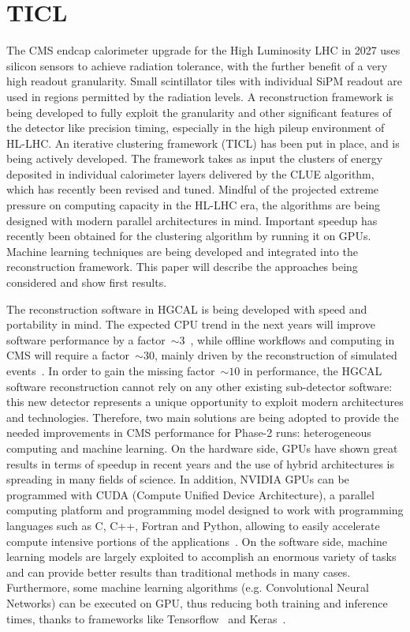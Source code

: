 \section{TICL}
\label{sec:hgcal:reco}


The CMS endcap calorimeter upgrade for the High Luminosity LHC in 2027 uses silicon sensors to achieve radiation tolerance, with the further benefit of a very high readout granularity. Small scintillator tiles with individual SiPM readout are used in regions permitted by the radiation levels. A reconstruction framework is being developed to fully exploit the granularity and other significant features of the detector like precision timing, especially in the high pileup environment of HL-LHC. An iterative clustering framework (TICL) has been put in place, and is being actively developed. The framework takes as input the clusters of energy deposited in individual calorimeter layers delivered by the CLUE algorithm, which has recently been revised and tuned. Mindful of the projected extreme pressure on computing capacity in the HL-LHC era, the algorithms are being designed with modern parallel architectures in mind. Important speedup has recently been obtained for the clustering algorithm by running it on GPUs. Machine learning techniques are being developed and integrated into the reconstruction framework. This paper will describe the approaches being considered and show first results.



The reconstruction software in HGCAL is being developed with speed and portability in mind. The expected CPU trend in the next years will improve software performance by a factor~$ \sim3$~\cite{4}, while offline workflows and computing in CMS will require a factor~$ \sim30$, mainly driven by the reconstruction of simulated events~\cite{5}. In order to gain the missing factor~$ \sim10$ in performance, the HGCAL software reconstruction cannot rely on any other existing sub-detector software: this new detector represents a unique opportunity to exploit modern architectures and technologies. Therefore, two main solutions are being adopted to provide the needed improvements in CMS performance for Phase-2 runs: heterogeneous computing and machine learning. On the hardware side, GPUs have shown great results in terms of speedup in recent years and the use of hybrid architectures is spreading in many fields of science. In addition, NVIDIA GPUs can be programmed with CUDA (Compute Unified Device Architecture), a parallel computing platform and programming model designed to work with programming languages such as C, C++, Fortran and Python, allowing to easily accelerate compute intensive portions of the applications~\cite{6}. On the software side, machine learning models are largely exploited to accomplish an enormous variety of tasks and can provide better results than traditional methods in many cases. Furthermore, some machine learning algorithms (e.g. Convolutional Neural Networks) can be executed on GPU, thus reducing both training and inference times, thanks to frameworks like Tensorflow~\cite{7} and Keras~\cite{8}.

